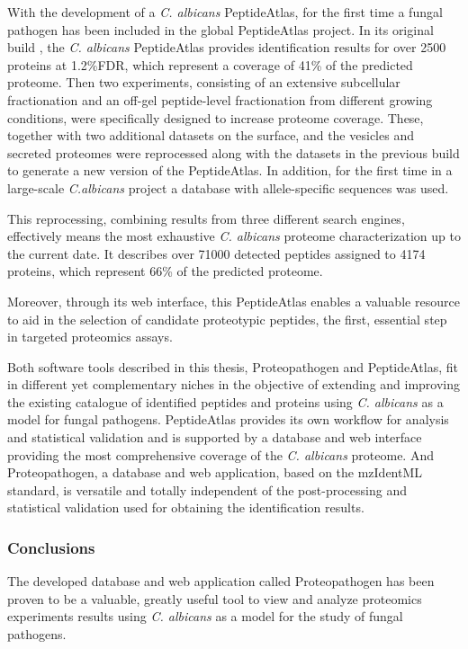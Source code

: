 With the development of a \textit{C. albicans} PeptideAtlas, for the
first time a fungal pathogen has been included in the global PeptideAtlas project.
In its original build \citep{Vialas2013}, the \textit{C. albicans} PeptideAtlas provides identification
results for over 2500 proteins at 1.2\%FDR, which represent a coverage of 41\% of
the predicted proteome. Then two 
experiments, consisting of an extensive subcellular fractionation and an off-gel
peptide-level fractionation from different growing conditions, were specifically
designed to increase proteome coverage. These, together with two additional datasets
on the surface, and the vesicles and secreted proteomes were reprocessed along with
the datasets in the previous build to generate a new version of the PeptideAtlas.
In addition, for the first time in a large-scale \textit{C.albicans} project
a database with allele-specific sequences was used. 

This reprocessing, combining results from three different search engines,
effectively means the most exhaustive \textit{C. albicans}
proteome characterization up to the current date.
It describes over 71000 detected peptides assigned to 4174 proteins, which
represent 66\% of the predicted proteome. 

Moreover, through its web interface, this PeptideAtlas enables a valuable
resource to aid in the selection of candidate proteotypic peptides, the
first, essential step in targeted proteomics assays.

Both software tools described in this thesis, Proteopathogen and PeptideAtlas,
fit in different yet complementary niches in the objective of extending and improving
the existing catalogue of identified peptides and proteins using \textit{C. albicans} 
as a model for fungal pathogens. PeptideAtlas provides its own workflow for analysis
and statistical validation and is supported by a database and web interface providing
the most comprehensive coverage of the \textit{C. albicans} proteome. And Proteopathogen, a database 
and web application, based on the mzIdentML standard, is versatile and totally independent
of the post-processing and statistical validation used for obtaining the identification results.

\subsubsection*{Conclusions}

The developed database and web application called Proteopathogen has been proven to be a
valuable, greatly useful tool to view and analyze proteomics experiments 
results using \textit{C. albicans} as a model for the study of fungal pathogens.

